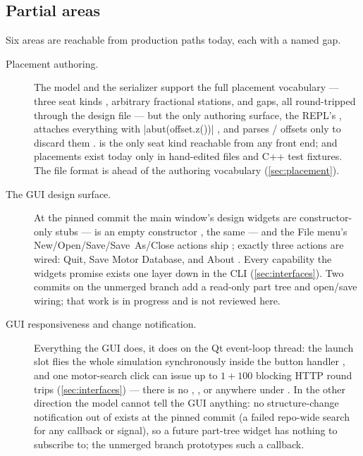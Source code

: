 \subsection{Partial areas}\label{sec:incomplete-partial}

Six areas are reachable from production paths today, each with a named gap.

\begin{description}

\item[Placement authoring.] The model and the serializer support the full placement
vocabulary --- three seat kinds , arbitrary fractional
stations, and gaps, all round-tripped through the design file
 --- but the only authoring surface, the REPL's
, attaches everything with \cppinline|abut(offset.z())|
, and parses / offsets only to discard them
.  is the only seat kind reachable from any front end;
 and  placements exist today only in hand-edited
 files and C++ test fixtures. The file format is ahead of the authoring
vocabulary (\cref{sec:placement}).

\item[The GUI design surface.] At the pinned commit the main window's design widgets are
constructor-only stubs ---  is an empty constructor
,  the same
 --- and the File menu's New/Open/Save/Save~As/Close
actions ship  ; exactly three actions are
wired: Quit, Save Motor Database, and About . Every capability
the widgets promise exists one layer down in the CLI (\cref{sec:interfaces}). Two commits
on the unmerged  branch add a read-only part tree and
 open/save wiring; that work is in progress and is not reviewed here.

\item[GUI responsiveness and change notification.] Everything the GUI does, it does on the
Qt event-loop thread: the launch slot flies the whole simulation synchronously inside the
button handler , and one motor-search click can issue up to
$1 + 100$ blocking HTTP round trips (\cref{sec:interfaces}) --- there is no ,
, or  anywhere under . In the
other direction the model cannot tell the GUI anything: no structure-change notification
out of  exists at the pinned commit (a failed repo-wide search for any
callback or signal), so a future part-tree widget has nothing to subscribe to; the unmerged
 branch prototypes such a callback.


\end{description}
